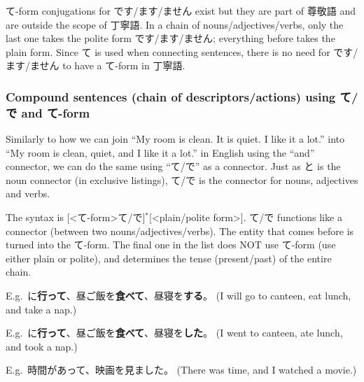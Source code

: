 \documentclass[../nihongo-gakushuu-kyouzai.tex]{subfiles}
\begin{document}
て-form conjugations for です/ます/ません exist but they are part of 尊敬語 and are outside the scope of 丁寧語. In a chain of nouns/adjectives/verbs, only the last one takes the polite form です/ます/ません; everything before takes the plain form. Since て is used when connecting sentences, there is no need for です/ます/ません to have a て-form in 丁寧語.

\subsubsection{Compound sentences (chain of descriptors/actions) using て/で and て-form}
Similarly to how we can join ``My room is clean. It is quiet. I like it a lot.'' into ``My room is clean, quiet, and I like it a lot.'' in English using the ``and'' connector, we can do the same using ``て/で'' as a connector. Just as と is the noun connector (in exclusive listings), て/で is the connector for nouns, adjectives and verbs.

The syntax is [<て-form>て/で]$^*$[<plain/polite form>]. て/で functions like a connector (between two nouns/adjectives/verbs). The entity that comes before is turned into the て-form. The final one in the list does NOT use て-form (use either plain or polite), and determines the tense (present/past) of the entire chain.

E.g.\ に\textbf{行って}、昼ご飯を\textbf{食べて}、昼寝を\textbf{する}。 (I will go to canteen, eat lunch, and take a nap.)

E.g.\ に\textbf{行って}、昼ご飯を\textbf{食べて}、昼寝を\textbf{した}。 (I went to canteen, ate lunch, and took a nap.)

E.g.\ 時間があって、映画を見ました。 (There was time, and I watched a movie.)
\end{document}
